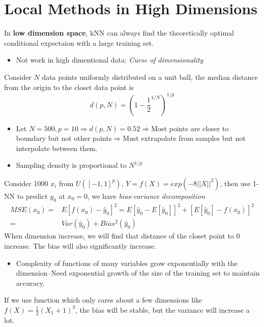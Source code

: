 \section{Local Methods in High Dimensions}
In \textbf{low dimension space}, kNN can always find the theoretically optimal conditional expectaion with a large training set. 
\begin{itemize}
	\item Not work in high dimentional data: \textit{Curse of dimensionality}
\end{itemize}
\begin{exmp}
	Consider $N$ data points uniformly distributed on a unit ball, the median distance from the origin to the closet data point is
	\begin{equation*}
	d(p,N)=(1-\frac{1}{2}^{1/N})^{1/p}
	\end{equation*}
	\begin{itemize}
		\item Let $N=500,p=10\Rightarrow d(p,N)=0.52\Rightarrow$Most points are closer to boundary but not other points$\Rightarrow$Must extrapolate from samples but not interpolate between them. 
		\item Sampling density is proportional to $N^{1/p}$
	\end{itemize}
\end{exmp}
\begin{exmp}
	Consider 1000 $x_i$ from $U([-1,1]^p)$, $Y=f(X)=exp(-8||X||^2)$, then use 1-NN to predict $y_0$ at $x_0=0$, we have \textit{bias-variance decomposition}
	\begin{align*}
		MSE(x_0)=&E[f(x_0)-\hat{y}_0]^2=E[\hat{y}_0-E[\hat{y}_0]]^2+[E[\hat{y}_0]-f(x_0)]^2\\
		=&Var(\hat{y}_0)+Bias^2(\hat{y}_0)
	\end{align*}
	When dimension increase, we will find that distance of the closet point to $0$ increase. The bias will also significantly increase. 
	\begin{itemize}
		\item Complexity of functions of many variables grow exponentially with the dimension--Need exponential growth of the size of the training set to maintain accuracy. 
	\end{itemize}
	If we use function which only cares about a few dimensions like $f(X)=\frac{1}{2}(X_1+1)^3$, the bias will be stable, but the variance will increase a lot. 
\end{exmp}

~

